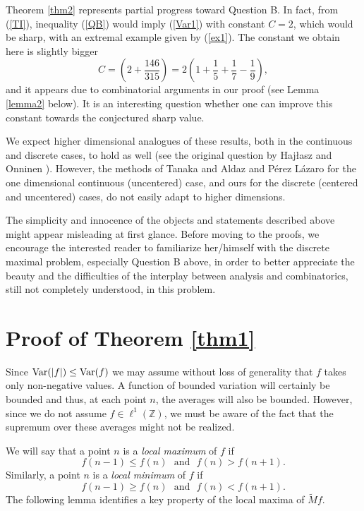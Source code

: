 \documentclass[reqno]{amsart}
\theoremstyle{definition}
\theoremstyle{remark}
\numberwithin{equation}{section}
\newcommand{\Z}{\mathbb{Z}}
\newcommand{\wM}{\widetilde{M}}
\newcommand{\Var}{\text{\rm Var}}
\begin{document}
Theorem \ref{thm2} represents partial progress toward Question B. In fact, from (\ref{TI}), inequality (\ref{QB}) would imply (\ref{Var1}) with constant $C=2$, which would be sharp, with an extremal example given by (\ref{ex1}). The constant we obtain here is slightly bigger 
$$C = \left(2 + \frac{146}{315} \right)  = 2 \left(1 + \frac{1}{5} + \frac{1}{7} - \frac{1}{9}\right),$$
and it appears due to combinatorial arguments in our proof (see Lemma \ref{lemma2} below). It is an interesting question whether one can improve this constant towards the conjectured sharp value.

We expect higher dimensional analogues of these results, both in the continuous and discrete cases, to hold as well (see the original question by Haj\l asz and Onninen \cite{HO}). However, the methods of Tanaka \cite{Ta} and Aldaz and P\'{e}rez L\'{a}zaro \cite{AP} for the one dimensional continuous (uncentered) case, and ours for the discrete (centered and uncentered) cases, do not easily adapt to higher dimensions.

The simplicity and innocence of the objects and statements described above might appear misleading at first glance. Before moving to the proofs, we encourage the interested reader to familiarize her/himself with the discrete maximal problem, especially Question B above, in order to better appreciate the beauty and the difficulties of the interplay between analysis and combinatorics, still not completely understood, in this problem. 

\section{Proof of Theorem \ref{thm1}}
Since $\Var(|f|) \leq \Var(f)$ we may assume without loss of generality that $f$ takes only non-negative values. A function of bounded variation will certainly be bounded and thus, at each point $n$, the averages will also be bounded. However, since we do not assume $f  \in \ell^1(\Z)$, we must be aware of the fact that the supremum over these averages might not be realized.

We will say that a point $n$ is a {\it local maximum} of $f$ if
\begin{equation*}
f(n-1) \leq f(n)  \ \ \ \textrm{and} \ \ \ f(n) > f(n+1).
\end{equation*}
Similarly, a point $n$ is a {\it local minimum} of $f$ if
\begin{equation*}
f(n-1) \geq f(n) \ \ \ \textrm{and} \ \ \ f(n) < f(n+1).
\end{equation*}
The following lemma identifies a key property of the local maxima of $\wM  f$. 
\end{document}
